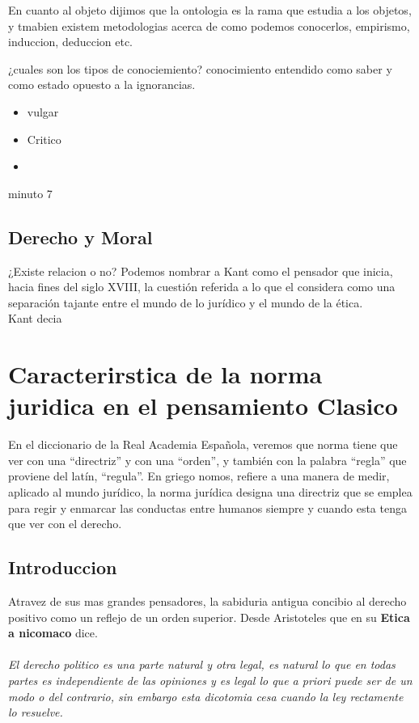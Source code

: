 \documentclass[12pt]{book}
\begin{document}
En cuanto al objeto dijimos que la ontologia es la rama que estudia a los objetos, y tmabien existem metodologias acerca de como podemos conocerlos, empirismo, induccion, deduccion etc.

¿cuales son los tipos de conociemiento? conocimiento entendido como saber y como estado opuesto a la ignorancias.

\begin{itemize}
\item vulgar
\item Critico
\item  
\end{itemize}

minuto 7

\section{Derecho y Moral}
¿Existe relacion o no? Podemos nombrar a Kant como el pensador que inicia, hacia fines del siglo XVIII, la cuestión referida a lo que el
considera como una separación tajante entre el mundo de lo jurídico y el mundo de la ética.\\
Kant decia

\chapter{Caracterirstica de la norma juridica en el pensamiento Clasico}
En el diccionario de la Real Academia Española, veremos que norma tiene que ver con una “directriz” y con una “orden”, y también con la palabra “regla” que proviene del latín, “regula”.
En griego nomos, refiere a una manera de medir, aplicado al mundo jurídico, la norma jurídica
designa una directriz que se emplea para regir y enmarcar las conductas entre humanos siempre y cuando esta tenga que ver con el derecho.
\section{Introduccion}
Atravez de sus mas grandes pensadores, la sabiduria antigua concibio al derecho positivo como un reflejo de un orden superior.
Desde Aristoteles que en su \textbf{Etica a nicomaco} dice.
\\
\\
\textit{El derecho politico es una parte natural y otra legal, es natural lo que en todas partes es independiente de las opiniones y es legal lo que a priori puede ser de un modo o del contrario, sin embargo esta dicotomia cesa cuando la ley rectamente lo resuelve.}
\end{document}
